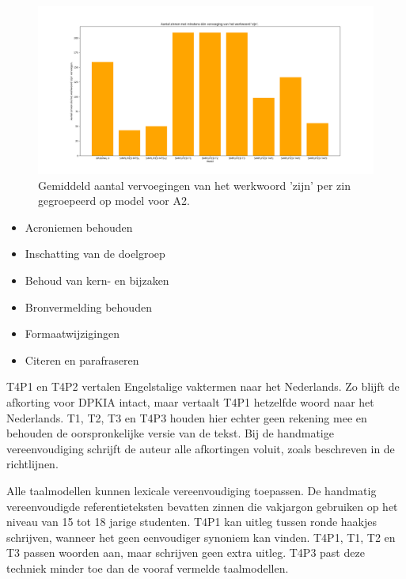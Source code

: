\begin{figure}
	\includegraphics[width=\linewidth]{img/boxplot-tobe-a2.png}
	\caption{Gemiddeld aantal vervoegingen van het werkwoord 'zijn' per zin gegroepeerd op model voor A2.}
	\label{img:histplot-tobe-a2}
\end{figure}


\begin{itemize}
	\item Acroniemen behouden
	\item Inschatting van de doelgroep
	\item Behoud van kern- en bijzaken
	\item Bronvermelding behouden
	\item Formaatwijzigingen
	\item Citeren en parafraseren
\end{itemize}


T4P1 en T4P2 vertalen Engelstalige vaktermen naar het Nederlands. Zo blijft de afkorting voor DPKIA intact, maar vertaalt T4P1 hetzelfde woord naar het Nederlands.  T1, T2, T3 en T4P3 houden hier echter geen rekening mee en behouden de oorspronkelijke versie van de tekst. Bij de handmatige vereenvoudiging schrijft de auteur alle afkortingen voluit, zoals beschreven in de richtlijnen. %

\medspace

Alle taalmodellen kunnen lexicale vereenvoudiging toepassen. De handmatig vereenvoudigde referentieteksten bevatten zinnen die vakjargon gebruiken op het niveau van 15 tot 18 jarige studenten. T4P1 kan uitleg tussen ronde haakjes schrijven, wanneer het geen eenvoudiger synoniem kan vinden. T4P1, T1, T2 en T3 passen woorden aan, maar schrijven geen extra uitleg. T4P3 past deze techniek minder toe dan de vooraf vermelde taalmodellen.

\medspace

